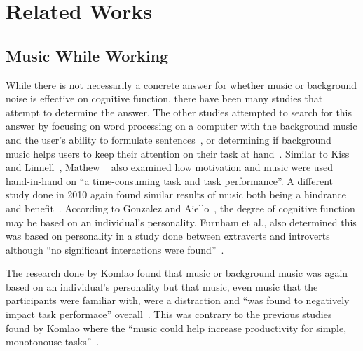 \documentclass[manuscript, screen, review]{acmart} %
\begin{document}
\section{Related Works}
\subsection{Music While Working}  %
While there is not necessarily a concrete answer for whether music or background noise is effective on cognitive function, there have been many
studies that attempt to determine the answer. 
The other studies attempted to search for this answer by focusing on word processing on a computer with the background music and the user's ability to formulate sentences~\cite{ransdell2001141}, or determining if background music helps users to keep their attention on their task at hand~\cite{kiss2021effect}. 
Similar to Kiss and Linnell~\cite{kiss2021effect}, Mathew ~\cite{mathew2022inherently} also examined how motivation and music were used hand-in-hand on ``a time-consuming task and task performance''. 
A different study done in 2010 again found similar results of music both being a hindrance and benefit~\cite{AudioDistractionsAshley}. 
According to Gonzalez and Aiello~\cite{Gonzalez_Aiello_2019}, the degree of cognitive function may be based on an individual's personality. 
Furnham et al., also determined this was based on personality in a study done between extraverts and introverts although ``no significant interactions were found''~\cite{distractingEffectsFurnham}.

The research done by Komlao found that music or background music was again based on an individual's personality but that music, even music that the participants were familiar with, were a distraction and ``was found to negatively impact task performace'' overall~\cite{komlao2018variations}.
This was contrary to the previous studies found by Komlao where the ``music could help increase productivity for simple, monotonouse tasks''~\cite{komlao2018variations}.
\end{document}
